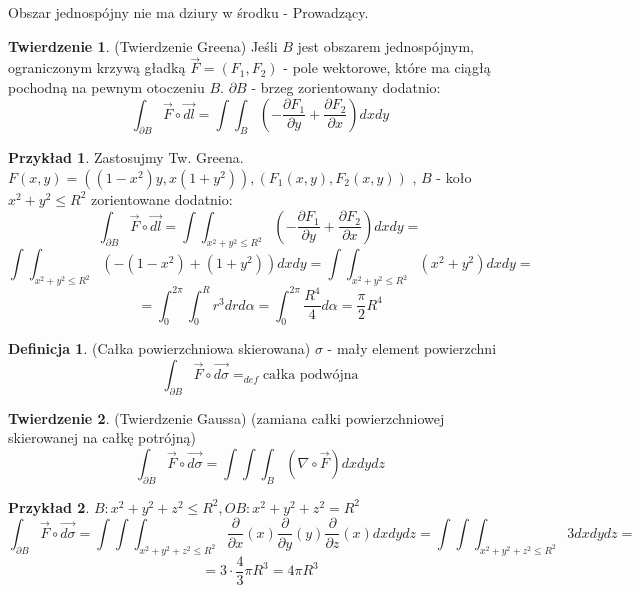 \documentclass{article}
\theoremstyle{definition}
\newtheorem{de}{Definicja}[subsection]
\theoremstyle{definition}
\newtheorem{tw}{Twierdzenie}[subsection]
\theoremstyle{definition}
\newtheorem{pk}{Przykład}[subsection]
\theoremstyle{definition}
\theoremstyle{definition}
\theoremstyle{definition}
\theoremstyle{definition}
\begin{document}
Obszar jednospójny nie ma dziury w środku - Prowadzący.

\begin{tw}
    (Twierdzenie Greena) Jeśli $B$ jest obszarem jednospójnym, ograniczonym krzywą gładką $\vec{F}=(F_1,F_2)$ - pole wektorowe, które ma ciągłą pochodną na pewnym otoczeniu $B$.
    \( \partial B \) - brzeg zorientowany dodatnio:
    \[ \int_{\partial B} \vec{F} \circ \vec{dl} = \int\int_{B} \left(-\frac{\partial F_1}{\partial y} + \frac{\partial F_2}{\partial x}\right) dx dy\]
\end{tw}

\begin{pk}
    Zastosujmy Tw. Greena. \( F(x,y) = \left((1-x^2)y, x(1+y^2)\right), (F_1(x,y),F_2(x,y))\)
    , $B$ - koło $x^2+y^2\leq R^2$ zorientowane dodatnio:
    \[ \int_{\partial B} \vec{F} \circ \vec{dl} = \int\int_{x^2+y^2\leq R^2} \left(- \frac{\partial F_1}{\partial y} + \frac{\partial F_2}{\partial x}\right) dx dy = \]
    \[ \int\int_{x^2+y^2\leq R^2} (-(1-x^2)+(1+y^2)) dxdy= \int\int_{x^2+y^2\leq R^2} (x^2+y^2) dxdy =\]
    \[ = \int_{0}^{2\pi} \int_{0}^{R} r^3 dr d\alpha = \int_{0}^{2\pi} \frac{R^4}{4} d\alpha = \frac{\pi}{2} R^4\]
\end{pk}


\begin{de}
    (Całka powierzchniowa skierowana) $\sigma$ - mały element powierzchni
    \[\int_{\partial B} \vec{F}\circ\vec{d\sigma} =_{def} \text{całka podwójna}\]  
\end{de}

\begin{tw}
    (Twierdzenie Gaussa) (zamiana całki powierzchniowej skierowanej na całkę potrójną)
    \[ \int_{\partial B} \vec{F} \circ \vec{d\sigma} = \int\int\int_{B} (\nabla \circ \vec{F}) dx dy dz \]
\end{tw}

\begin{pk}
    $B: x^2 + y^2 + z^2 \leq R^2, OB: x^2+y^2+z^2 = R^2$
    \[ \int_{\partial B} \vec{F} \circ \vec{d\sigma} = \int\int\int_{x^2+y^2+z^2 \leq R^2} \frac{\partial}{\partial x} (x) \frac{\partial}{\partial y} (y) \frac{\partial}{\partial z} (x) dxdydz = \int\int\int_{x^2+y^2+z^2 \leq R^2} 3 dx dy dz =\]
    \[ = 3\cdot \frac{4}{3} \pi R^3 = 4\pi R^3\]
\end{pk}
\end{document}

